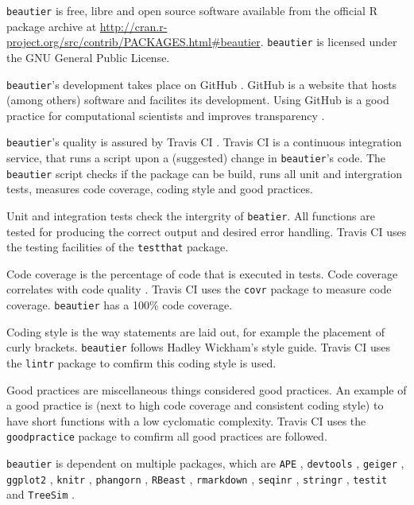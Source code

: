 \documentclass{article}
\begin{document}
\verb;beautier; is free, libre and open source software available from the official R package archive at 
\url{http://cran.r-project.org/src/contrib/PACKAGES.html\#beautier}.  
\verb;beautier; is licensed under the GNU General Public License.

\verb;beautier;'s development takes place on GitHub \cite{github}. 
GitHub is a website that hosts (among others) software and facilites its development.
Using GitHub is a good practice for computational scientists \cite{perez2016ten} 
and improves transparency \cite{gorgolewski2016practical}.

\verb;beautier;'s quality is assured by Travis CI \cite{travis}. Travis CI is
a continuous integration service, that runs a script upon a (suggested)
change in \verb;beautier;'s code. The \verb;beautier; script checks if the
package can be build, runs all unit and intergration tests, 
measures code coverage, coding style and good practices.

Unit and integration tests check the intergrity of \verb;beatier;. All functions
are tested for producing the correct output and desired error handling. 
Travis CI uses the testing facilities of the \verb;testthat; \cite{testthat} package.

Code coverage is the percentage of code that is executed in tests. 
Code coverage correlates with code quality \cite{del1995correlation}. 
Travis CI uses the \verb;covr; \cite{covr} package to measure code coverage. 
\verb;beautier; has a 100\% code coverage. 

Coding style is the way statements are laid out, for example the placement of 
curly brackets. \verb;beautier; follows Hadley Wickham's style guide. 
Travis CI uses the \verb;lintr; \cite{lintr} package to comfirm this coding style
is used.

Good practices are miscellaneous things considered good practices. An example
of a good practice is (next to high code coverage and consistent coding style) 
to have short functions with a low cyclomatic complexity. Travis CI uses 
the \verb;goodpractice; \cite{goodpractice} package to comfirm all good practices
are followed.

\verb;beautier; is dependent on multiple packages, which are 
\verb;APE; \cite{APE}, 
\verb;devtools; \cite{devtools},
\verb;geiger; \cite{GEIGER},
\verb;ggplot2; \cite{ggplot2},
\verb;knitr; \cite{knitr},
\verb;phangorn; \cite{phangorn},
\verb;RBeast; \cite{RBeast},
\verb;rmarkdown; \cite{rmarkdown},
\verb;seqinr; \cite{seqinr},
\verb;stringr; \cite{stringr},
\verb;testit; \cite{testit} and 
\verb;TreeSim; \cite{TreeSim}.
\end{document}
